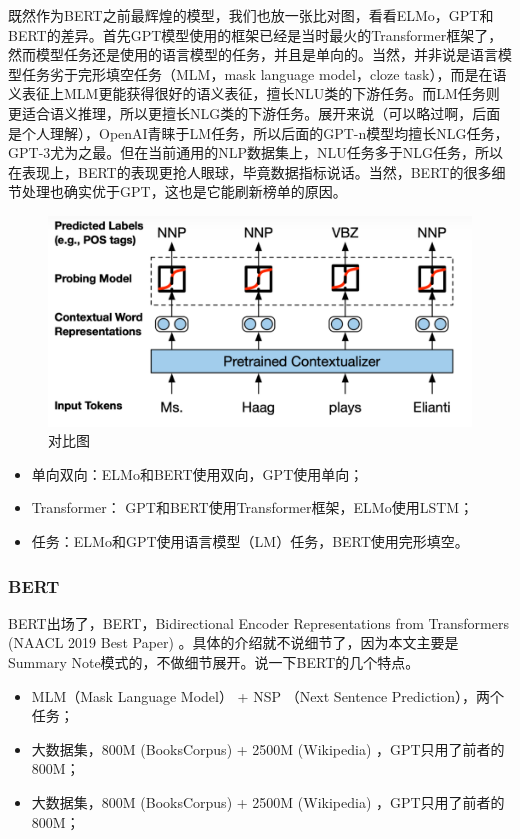 \documentclass{article} %
\begin{document}
既然作为BERT之前最辉煌的模型，我们也放一张比对图，看看ELMo，GPT和BERT的差异。首先GPT模型使用的框架已经是当时最火的Transformer框架了，然而模型任务还是使用的语言模型的任务，并且是单向的。当然，并非说是语言模型任务劣于完形填空任务（MLM，mask language model，cloze task），而是在语义表征上MLM更能获得很好的语义表征，擅长NLU类的下游任务。而LM任务则更适合语义推理，所以更擅长NLG类的下游任务。展开来说（可以略过啊，后面是个人理解），OpenAI青睐于LM任务，所以后面的GPT-n模型均擅长NLG任务，GPT-3尤为之最。但在当前通用的NLP数据集上，NLU任务多于NLG任务，所以在表现上，BERT的表现更抢人眼球，毕竟数据指标说话。当然，BERT的很多细节处理也确实优于GPT，这也是它能刷新榜单的原因。
\begin{figure}[h] %
    \centering %
    \includegraphics[width=\textwidth]{4.png} %
    \caption{对比图} %
    \label{fig:example} %
\end{figure}
\FloatBarrier
\begin{itemize}
    \item 单向双向：ELMo和BERT使用双向，GPT使用单向；
    \item Transformer： GPT和BERT使用Transformer框架，ELMo使用LSTM；
    \item 任务：ELMo和GPT使用语言模型（LM）任务，BERT使用完形填空。
\end{itemize}

\subsubsection{BERT}
BERT出场了，BERT，Bidirectional Encoder Representations from Transformers (NAACL 2019 Best Paper) 。具体的介绍就不说细节了，因为本文主要是Summary Note模式的，不做细节展开。说一下BERT的几个特点。

\begin{itemize}
    \item MLM（Mask Language Model） + NSP （Next Sentence Prediction），两个任务；
    \item 大数据集，800M (BooksCorpus) + 2500M (Wikipedia) ，GPT只用了前者的800M；
    \item 大数据集，800M (BooksCorpus) + 2500M (Wikipedia) ，GPT只用了前者的800M；
\end{itemize}
\end{document}
